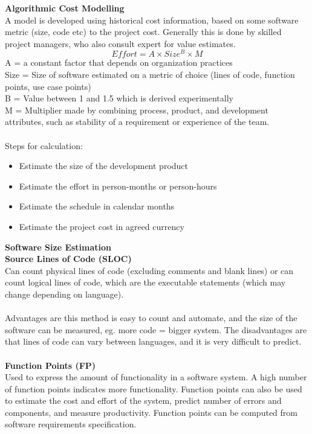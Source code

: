 \documentclass[a4paper,10pt]{article}
\begin{document}
\textcolor{BlueGreen}{\textbf{Algorithmic Cost Modelling}} \\
A model is developed using historical cost information, based on some software metric (size, code etc) to the project cost. Generally this is done by skilled project managers, who also consult expert for value estimates. 
\begin{equation*}
	Effort = A \times Size^{B} \times M
\end{equation*}
A = a constant factor that depends on organization practices \\
Size = Size of software estimated on a metric of choice (lines of code, function points, use case points) \\
B = Value between 1 and 1.5 which is derived experimentally \\
M = Multiplier made by combining process, product, and development attributes, such as stability of a requirement or experience of the team. \\\\
Steps for calculation:
\begin{itemize}
	\item Estimate the size of the development product 
	\item Estimate the effort in person-months or person-hours 
	\item Estimate the schedule in calendar months 
	\item Estimate the project cost in agreed currency 
\end{itemize}
\newpage
\noindent \textcolor{BlueGreen}{\textbf{Software Size Estimation}} \\
\textbf{Source Lines of Code (SLOC)} \\
Can count physical lines of code (excluding comments and blank lines) or can count logical lines of code, which are the executable statements (which may change depending on language). \\\\
Advantages are this method is easy to count and automate, and the size of the software can be measured, eg. more code = bigger system. The disadvantages are that lines of code can vary between languages, and it is very difficult to predict. \\\\ 
\textbf{Function Points (FP)} \\
Used to express the amount of functionality in a software system. A high number of function points indicates more functionality. Function points can also be used to estimate the cost and effort of the system, predict number of errors and components, and measure productivity. Function points can be computed from software requirements specification. \\\\
\end{document}
